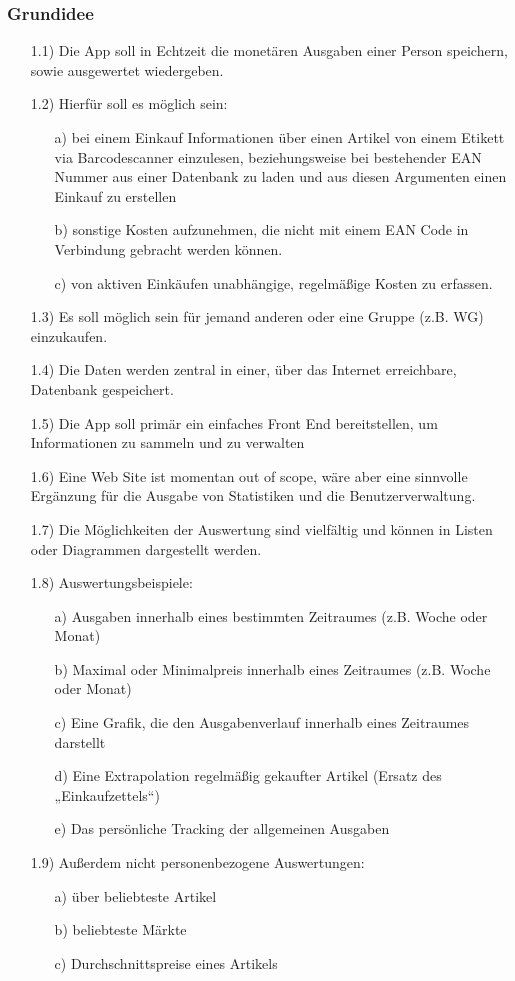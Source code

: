 \documentclass[12pt,a4paper]{article}
\begin{document}
\subsubsection{Grundidee}
\begin{itemize}
 \item[1.1)] Die App soll in Echtzeit die monetären Ausgaben einer Person speichern, sowie ausgewertet wiedergeben.
 \item[1.2)] Hierfür soll es möglich sein:
 \begin{itemize}
 \item[a)] bei einem Einkauf Informationen über einen Artikel von einem Etikett via Barcodescanner einzulesen, beziehungsweise bei bestehender EAN Nummer aus einer Datenbank zu laden und aus diesen Argumenten einen Einkauf zu erstellen
  \item[b)] sonstige Kosten aufzunehmen, die nicht mit einem EAN Code in Verbindung gebracht werden können.
  \item[c)] von aktiven Einkäufen unabhängige, regelmäßige Kosten zu erfassen.
  \end{itemize}
 \item[1.3)] Es soll möglich sein für jemand anderen oder eine Gruppe (z.B. WG) einzukaufen.
 \item[1.4)] Die Daten werden zentral in einer, über das Internet erreichbare, Datenbank gespeichert.
 \item[1.5)] Die App soll primär ein einfaches Front End bereitstellen, um Informationen zu sammeln und zu verwalten
 \item[1.6)] Eine Web Site ist momentan out of scope, wäre aber eine sinnvolle Ergänzung für die Ausgabe von Statistiken und die Benutzerverwaltung.
 \item[1.7)] Die Möglichkeiten der Auswertung sind vielfältig und können in Listen oder Diagrammen dargestellt werden.
 \newpage
 \item[1.8)] Auswertungsbeispiele:
 \begin{itemize}
\item[a)]Ausgaben innerhalb eines bestimmten Zeitraumes (z.B. Woche oder Monat)
 \item[b)] Maximal oder Minimalpreis innerhalb eines Zeitraumes (z.B. Woche oder Monat) 
\item[c)] Eine Grafik, die den Ausgabenverlauf innerhalb eines Zeitraumes darstellt
\item[d)] Eine Extrapolation regelmäßig gekaufter Artikel (Ersatz des „Einkaufzettels“)
\item[e)]Das persönliche Tracking der allgemeinen Ausgaben
\end{itemize}
 \item[1.9)] Außerdem nicht personenbezogene Auswertungen:
 \begin{itemize}
\item[a)]über beliebteste Artikel
\item[b)] beliebteste Märkte
\item[c)] Durchschnittspreise eines Artikels
\end{itemize}
\end{itemize}
 
\end{document}
